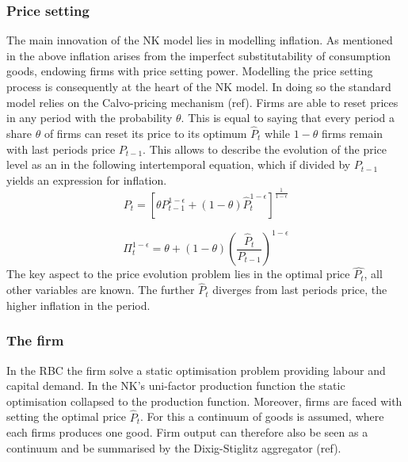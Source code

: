 \documentclass[12pt,a4paper,english]{article} %
\begin{document}
	\subsubsection{Price setting}
	The main innovation of the NK model lies in modelling inflation. As mentioned in the above inflation arises from the imperfect substitutability of consumption goods, endowing firms with price setting power. Modelling the price setting process is consequently at the heart of the NK model. In doing so the standard model relies on the Calvo-pricing mechanism (ref). Firms are able to reset prices in any period with the probability $\theta$. This is equal to saying that every period a share $\theta$ of firms can reset its price to its optimum $\hat{P}_t$ while $1-\theta$ firms remain with last periods price $P_{t-1}$. This allows to describe the evolution of the price level as an in the following intertemporal equation, which if divided by $P_{t-1}$ yields an expression for inflation.
	\begin{equation}
		P_t = 
		\left[
		\theta P_{t-1}^{1 - \epsilon} + (1 - \theta) \hat{P}_t^{1 - \epsilon}
		\right]^{\frac{1}{1 - \epsilon}}
	\end{equation}

	\begin{equation} \label{eq:inflation}
		\Pi_t^{1-\epsilon} = \theta + (1 - \theta) \left(\frac{\hat{P}_t}{P_{t-1}} \right)^{1-\epsilon}
	\end{equation}
	The key aspect to the price evolution problem lies in the optimal price $\hat{P_t}$, all other variables are known. The further $\hat{P}_t$ diverges from last periods price, the higher inflation in the period. 
	
	\subsubsection{The firm} \label{nk_the_firm}
	In the RBC the firm solve a static optimisation problem providing labour and capital demand. In the NK's uni-factor production function the static optimisation collapsed to the production function. Moreover, firms are faced with setting the optimal price $\hat{P}_t$. For this a continuum of goods is assumed, where each firms produces one good. Firm output can therefore also be seen as a continuum and be summarised by the Dixig-Stiglitz aggregator (ref). 
	
\end{document}
